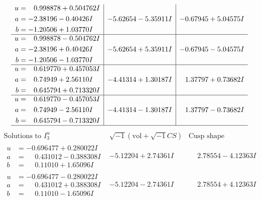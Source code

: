 \documentclass[1p]{elsarticle_modified}
\theoremstyle{definition}
\newcommand{\I}{\sqrt{-1}}
\begin{document}
$$\begin{array}{c|c|c}
\begin{aligned}
u &= \phantom{-}0.998878 + 0.504762 I \\
a &= -2.38196 - 0.40426 I \\
b &= -1.20506 + 1.03770 I\end{aligned}
 & -5.62654 - 5.35911 I & -0.67945 + 5.04575 I \\ \hline\begin{aligned}
u &= \phantom{-}0.998878 - 0.504762 I \\
a &= -2.38196 + 0.40426 I \\
b &= -1.20506 - 1.03770 I\end{aligned}
 & -5.62654 + 5.35911 I & -0.67945 - 5.04575 I \\ \hline\begin{aligned}
u &= \phantom{-}0.619770 + 0.457053 I \\
a &= \phantom{-}0.74949 + 2.56110 I \\
b &= \phantom{-}0.645794 + 0.713320 I\end{aligned}
 & -4.41314 + 1.30187 I & \phantom{-}1.37797 + 0.73682 I \\ \hline\begin{aligned}
u &= \phantom{-}0.619770 - 0.457053 I \\
a &= \phantom{-}0.74949 - 2.56110 I \\
b &= \phantom{-}0.645794 - 0.713320 I\end{aligned}
 & -4.41314 - 1.30187 I & \phantom{-}1.37797 - 0.73682 I\\
 \hline 
 \end{array}$$\newpage$$\begin{array}{c|c|c}  
\text{Solutions to }I^u_{3}& \I (\text{vol} + \sqrt{-1}CS) & \text{Cusp shape}\\
 \hline 
\begin{aligned}
u &= -0.696477 + 0.280022 I \\
a &= \phantom{-}0.431012 - 0.388308 I \\
b &= \phantom{-}0.11010 + 1.65096 I\end{aligned}
 & -5.12204 + 2.74361 I & \phantom{-}2.78554 - 4.12363 I \\ \hline\begin{aligned}
u &= -0.696477 - 0.280022 I \\
a &= \phantom{-}0.431012 + 0.388308 I \\
b &= \phantom{-}0.11010 - 1.65096 I\end{aligned}
 & -5.12204 - 2.74361 I & \phantom{-}2.78554 + 4.12363 I \\ \hline\begin{aligned}

\end{aligned}
\end{array}$$
\end{document}
